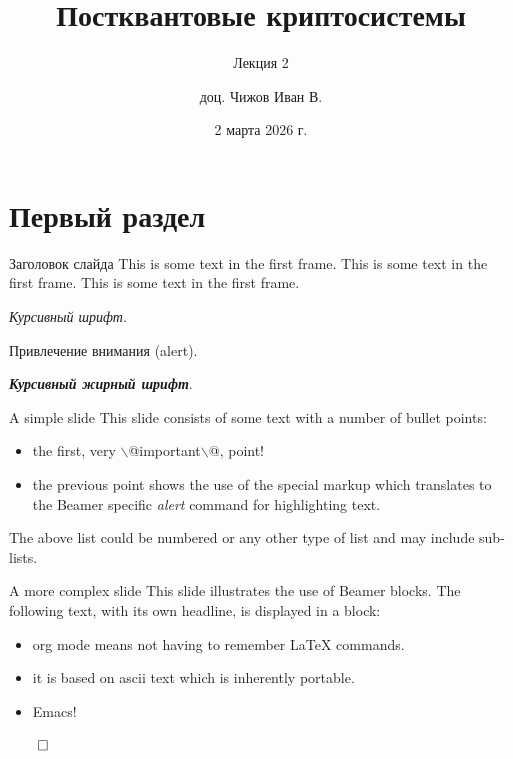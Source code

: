 \documentclass[aspectratio=169, 12pt]{beamer}
\author{доц. Чижов Иван В.}
\date{2 марта 2026 г.}
\title{Постквантовые криптосистемы}
\subtitle{Лекция 2}
\begin{document}
\maketitle
\begin{frame}{}
    \tableofcontents
\end{frame}

\section{Первый раздел}
\label{sec:orgc0256fc}
\begin{frame}[label={sec:org5fdf876}]{Заголовок слайда}
    This is some text in the first frame. This is some text in the first
    frame. This is some text in the first frame.

    \emph{Курсивный шрифт}.

    \alert{Привлечение внимания (alert)}.

    \emph{\textbf{Курсивный жирный шрифт}}.
\end{frame}
\begin{frame}[label={sec:orgcc70f65}]{A simple slide}
    This slide consists of some text with a number of bullet points:

    \begin{itemize}
        \item the first, very $\backslash$@important$\backslash$@, point!
        \item the previous point shows the use of the special markup which
              translates to the Beamer specific \emph{alert} command for highlighting
              text.
    \end{itemize}


    The above list could be numbered or any other type of list and may
    include sub-lists.
\end{frame}
\begin{frame}[label={sec:org1b8cba9}]{A more complex slide}
    This slide illustrates the use of Beamer blocks.  The following text,
    with its own headline, is displayed in a block:
    \begin{theorem}\label{sec:org6bc93c5}
        \begin{itemize}
            \item org mode means not having to remember \LaTeX{} commands.
            \item it is based on ascii text which is inherently portable.
            \item Emacs!
        \end{itemize}

        \hfill \(\qed\)
    \end{theorem}
\end{frame}
\end{document}
